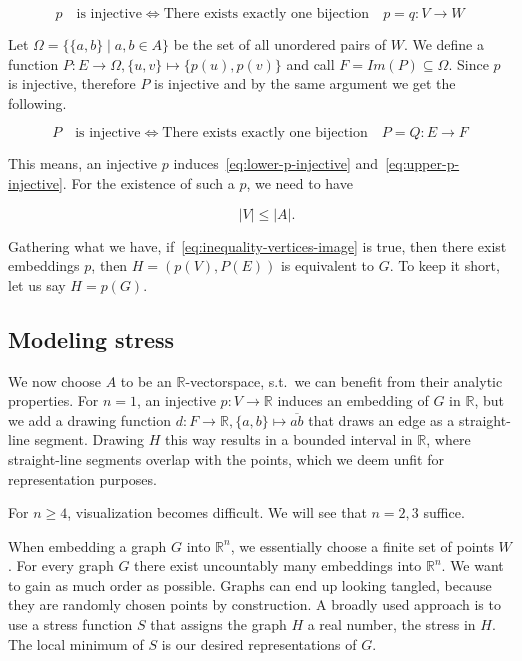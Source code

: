 \documentclass[12pt]{article}
\begin{document}
\begin{equation} \label{eq:lower-p-injective}
    p \quad \text{is injective} \iff \text{There exists exactly one bijection} \quad p=q : V \to W
\end{equation}

Let $\Omega = \{ \{a,b \} \mid a,b \in A \} $ be the set of all unordered pairs of $W$. We define a function
$P : E \to \Omega, \{ u,v \} \mapsto \{ p(u),p(v) \}$ and call $F=Im(P) \subseteq \Omega$.
Since $p$ is injective, therefore $P$ is injective and by the same argument we get the following.

\begin{equation} \label{eq:upper-p-injective}
    P \quad \text{is injective} \iff \text{There exists exactly one bijection} \quad P=Q : E \to F
\end{equation}

This means, an injective $p$ induces~\eqref{eq:lower-p-injective} and~\eqref{eq:upper-p-injective}. For the existence of such a $p$, we need to have

\begin{equation} \label{eq:inequality-vertices-image}
    \quad |V| \leq |A| \text{.}
\end{equation}

Gathering what we have, if~\eqref{eq:inequality-vertices-image} is true,
then there exist embeddings $p$, then $H = (p(V), P(E))$ is equivalent to $G$.
To keep it short, let us say $H=p(G)$.

\subsection{Modeling stress}

We now choose $A$ to be an $\mathbb{R}$-vectorspace, s.t.\ we can benefit from their analytic properties.
For $n = 1$, an injective  $ p : V \to \mathbb{R}$ induces an embedding of $G$ in $\mathbb{R}$,
but we add a drawing function $d : F \to \mathbb{R}, \{ a,b \} \mapsto \overline{ab}$ that draws an edge as a straight-line segment.
Drawing $H$ this way results in a bounded interval in $\mathbb{R}$,
where straight-line segments overlap with the points,
which we deem unfit for representation purposes.

For $n \geq 4$, visualization becomes difficult. We will see that $n=2,3$ suffice.

When embedding a graph $G$ into $\mathbb{R} ^n$, we essentially choose a finite set of points $W$.
For every graph $G$ there exist uncountably many embeddings into $\mathbb{R} ^n$.
We want to gain as much order as possible. Graphs can end up looking tangled, because they are randomly chosen points by construction.
A broadly used approach is to use a stress function $S$ that assigns the graph $H$ a real number, the stress in $H$.
The local minimum of $S$ is our desired representations of $G$.
\end{document}
